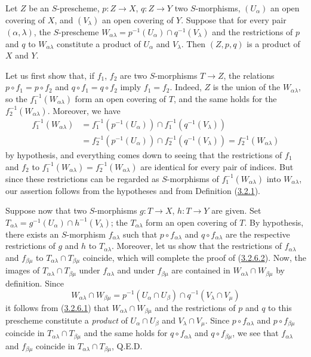 \begin{lemma}[3.2.6.2]
\label{I.3.2.6.2}
Let $Z$ be an $S$-prescheme, $p:Z\to X$, $q:Z\to Y$ two $S$-morphisms,
$(U_\alpha)$ an open covering of $X$, and $(V_\lambda)$ an open covering
of $Y$. Suppose that for every pair $(\alpha,\lambda)$, the
$S$-prescheme
$W_{\alpha\lambda}=p^{-1}(U_\alpha)\cap q^{-1}(V_\lambda)$ and the
restrictions of $p$ and $q$ to $W_{\alpha\lambda}$ constitute a product of
$U_\alpha$ and $V_\lambda$. Then $(Z,p,q)$ is a product of $X$ and $Y$.
\end{lemma}

Let us first show that, if $f_1$, $f_2$ are two $S$-morphisms $T\to Z$, the
relations $p\circ f_1=p\circ f_2$ and $q\circ f_1=q\circ f_2$ imply
$f_1=f_2$. Indeed, $Z$ is the union of the $W_{\alpha\lambda}$, so the
$f_1^{-1}(W_{\alpha\lambda})$ form an open covering of $T$, and
the same holds for the $f_2^{-1}(W_{\alpha\lambda})$. Moreover, we have
\[
\begin{aligned}
  f_1^{-1}(W_{\alpha\lambda})
  &=f_1^{-1}(p^{-1}(U_\alpha))\cap
    f_1^{-1}(q^{-1}(V_\lambda)) \\
  &=f_2^{-1}(p^{-1}(U_\alpha))\cap
    f_2^{-1}(q^{-1}(V_\lambda))
   =f_2^{-1}(W_{\alpha\lambda})
\end{aligned}
\]
by hypothesis, and everything comes down to seeing that the restrictions of
$f_1$ and $f_2$ to $f_1^{-1}(W_{\alpha\lambda})=f_2^{-1}(W_{\alpha\lambda})$ are
identical for every pair of indices. But since these restrictions can be
regarded as $S$-morphisms of
$f_1^{-1}(W_{\alpha\lambda})$ into $W_{\alpha\lambda}$, our assertion
follows from the hypotheses and from Definition (\hyperref[I.3.2.1]{3.2.1}).

Suppose now that two $S$-morphisms $g:T\to X$, $h:T\to Y$ are given.
Set
$T_{\alpha\lambda}=g^{-1}(U_\alpha)\cap h^{-1}(V_\lambda)$; the
$T_{\alpha\lambda}$ form an open covering of $T$. By hypothesis,
there exists an $S$-morphism $f_{\alpha\lambda}$ such that
$p\circ f_{\alpha\lambda}$ and $q\circ f_{\alpha\lambda}$ are the
respective restrictions of $g$ and $h$ to $T_{\alpha\lambda}$. Moreover,
let us show that the restrictions of $f_{\alpha\lambda}$ and
$f_{\beta\mu}$ to
$T_{\alpha\lambda}\cap T_{\beta\mu}$ coincide, which will complete the
proof of (\hyperref[I.3.2.6.2]{3.2.6.2}). Now, the images of
$T_{\alpha\lambda}\cap T_{\beta\mu}$ under $f_{\alpha\lambda}$ and under
$f_{\beta\mu}$ are contained in
$W_{\alpha\lambda}\cap W_{\beta\mu}$ by definition. Since
\[
  W_{\alpha\lambda}\cap W_{\beta\mu}
  =p^{-1}(U_\alpha\cap U_\beta)\cap
   q^{-1}(V_\lambda\cap V_\mu)
\]
it follows from (\hyperref[I.3.2.6.1]{3.2.6.1}) that
$W_{\alpha\lambda}\cap W_{\beta\mu}$ and the restrictions of $p$ and $q$ to
this prescheme constitute a \emph{product} of
$U_\alpha\cap U_\beta$ and $V_\lambda\cap V_\mu$. Since
$p\circ f_{\alpha\lambda}$ and $p\circ f_{\beta\mu}$ coincide in
$T_{\alpha\lambda}\cap T_{\beta\mu}$ and the same holds for
$q\circ f_{\alpha\lambda}$ and $q\circ f_{\beta\mu}$, we see that
$f_{\alpha\lambda}$ and $f_{\beta\mu}$ coincide in
$T_{\alpha\lambda}\cap T_{\beta\mu}$, Q.E.D.


